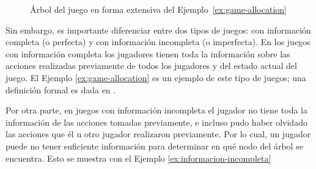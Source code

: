\begin{figure}[ht]
\begin{center}
\caption{Árbol del juego en forma extensiva del Ejemplo~\ref{ex:game-allocation}}
\label{fig:game-allocation}
\end{center}
\end{figure}

Sin embargo, es importante diferenciar entre dos tipos de juegos: con información completa (o perfecta) y con información incompleta (o imperfecta). En los juegos con información completa los jugadores tienen toda la información sobre las acciones realizadas previamente de todos los jugadores y del estado actual del juego. El Ejemplo \ref{ex:game-allocation} es un ejemplo de este tipo de juegos; una definición formal es dada en \cite[pp. 89--90]{bib:course-game-theory}.

Por otra parte, en juegos con información incompleta el jugador no tiene toda la información de las acciones tomadas previamente, e incluso pudo haber olvidado las acciones que él u otro jugador realizaron previamente. Por lo cual, un jugador puede no tener suficiente información para determinar en qué nodo del árbol se encuentra. Esto se muestra con el Ejemplo \ref{ex:informacion-incompleta} \cite[p.~202]{bib:course-game-theory}

